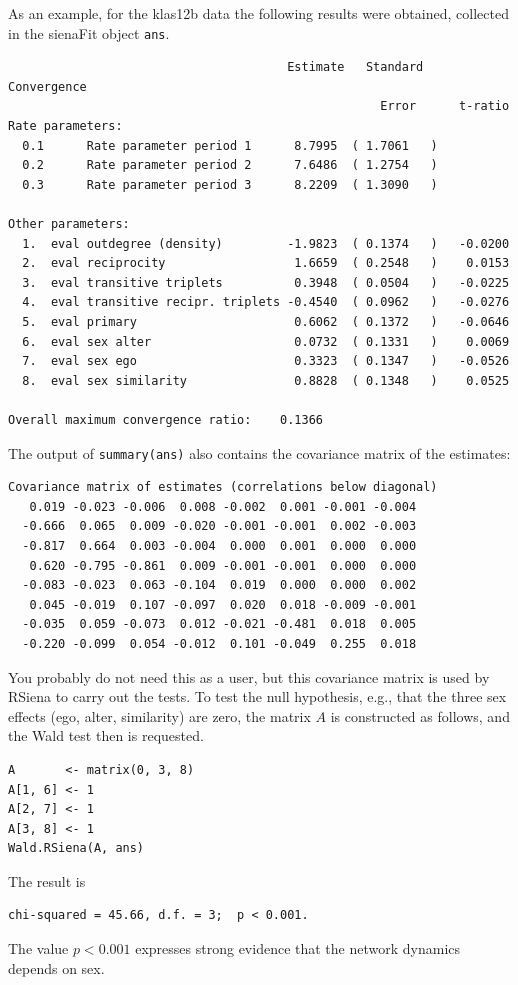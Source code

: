 \documentclass[a4paper,fleqn,11pt]{article}
\newcommand{\+}{\, + \,}
\newcommand{\RS}{{\sf \textsf{RSiena} }}
\begin{document}
As an example, for the \textsf{klas12b} data
the following results were obtained,
collected in the \textsf{sienaFit} object \texttt{ans}.
\begin{small}
\begin{verbatim}
                                       Estimate   Standard   Convergence
                                                    Error      t-ratio
Rate parameters:
  0.1      Rate parameter period 1      8.7995  ( 1.7061   )
  0.2      Rate parameter period 2      7.6486  ( 1.2754   )
  0.3      Rate parameter period 3      8.2209  ( 1.3090   )

Other parameters:
  1.  eval outdegree (density)         -1.9823  ( 0.1374   )   -0.0200
  2.  eval reciprocity                  1.6659  ( 0.2548   )    0.0153
  3.  eval transitive triplets          0.3948  ( 0.0504   )   -0.0225
  4.  eval transitive recipr. triplets -0.4540  ( 0.0962   )   -0.0276
  5.  eval primary                      0.6062  ( 0.1372   )   -0.0646
  6.  eval sex alter                    0.0732  ( 0.1331   )    0.0069
  7.  eval sex ego                      0.3323  ( 0.1347   )   -0.0526
  8.  eval sex similarity               0.8828  ( 0.1348   )    0.0525

Overall maximum convergence ratio:    0.1366
\end{verbatim}
\end{small}
The output of \texttt{summary(ans)} also contains the
covariance matrix of the estimates:
\begin{footnotesize}
\begin{verbatim}
Covariance matrix of estimates (correlations below diagonal)
   0.019 -0.023 -0.006  0.008 -0.002  0.001 -0.001 -0.004
  -0.666  0.065  0.009 -0.020 -0.001 -0.001  0.002 -0.003
  -0.817  0.664  0.003 -0.004  0.000  0.001  0.000  0.000
   0.620 -0.795 -0.861  0.009 -0.001 -0.001  0.000  0.000
  -0.083 -0.023  0.063 -0.104  0.019  0.000  0.000  0.002
   0.045 -0.019  0.107 -0.097  0.020  0.018 -0.009 -0.001
  -0.035  0.059 -0.073  0.012 -0.021 -0.481  0.018  0.005
  -0.220 -0.099  0.054 -0.012  0.101 -0.049  0.255  0.018
\end{verbatim}
\end{footnotesize}
You probably do not need this as a user, but this covariance matrix
is used by \RS to carry out the tests.
To test the null hypothesis, e.g., that the three sex effects
(ego, alter, similarity) are zero,
the matrix $A$ is constructed as follows, and the Wald test then is requested.
\begin{small}
\begin{verbatim}
A       <- matrix(0, 3, 8)
A[1, 6] <- 1
A[2, 7] <- 1
A[3, 8] <- 1
Wald.RSiena(A, ans)
\end{verbatim}
\end{small}
The result is
\begin{small}
\begin{verbatim}
chi-squared = 45.66, d.f. = 3;  p < 0.001.
\end{verbatim}
\end{small}
The value $p < 0.001$ expresses strong evidence
that the network dynamics depends on sex.
\bigskip
\end{document}
